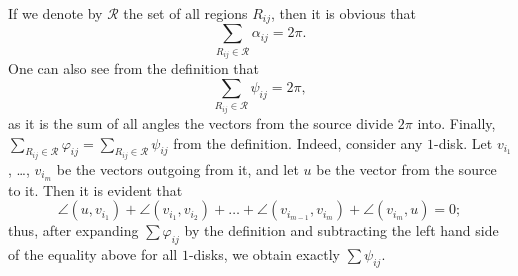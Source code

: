 
If we denote by $\mathcal{R}$ the set of all regions $R_{ij}$, then it is obvious that $$\sum_{R_{ij}\in\mathcal{R}}\alpha_{ij} = 2\pi.$$ One can also see from the definition that $$\sum_{R_{ij}\in\mathcal{R}}\psi_{ij} = 2\pi,$$ as it is the sum of all angles the vectors from the source divide $2\pi$ into. Finally, $\sum_{R_{ij}\in\mathcal{R}}\varphi_{ij} = \sum_{R_{ij}\in\mathcal{R}}\psi_{ij}$ from the definition. Indeed, consider any $1$-disk. Let $v_{i_1}$, \ldots, $v_{i_m}$ be the vectors outgoing from it, and let $u$ be the vector from the source to it. Then it is evident that
$$\angle(u, v_{i_1}) + \angle(v_{i_1}, v_{i_2}) + \ldots + \angle(v_{i_{m-1}}, v_{i_m}) + \angle(v_{i_m}, u) = 0;$$
thus, after expanding $\sum\varphi_{ij}$ by the definition and subtracting the left hand side of the equality above for all $1$-disks, we obtain exactly $\sum\psi_{ij}$.


